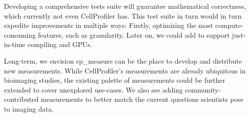 \documentclass{article}
\begin{document}
Developing a comprehensive tests suite will guarantee mathematical correctness, which currently not even CellProfiler has. This test suite in turn would in turn expedite improvements in multiple ways: Firstly, optimizing the most compute-consuming features, such as granularity. Later on, we could add to support just-in-time compiling and GPUs.

Long-term, we envision cp\_measure can be the place to develop and distribute new measurements. While CellProfiler's measurements are already ubiquitous in bioimaging studies, the existing palette of measurements could be further extended to cover unexplored use-cases. We also see adding community-contributed measurements to better match the current questions scientists pose to imaging data.



\end{document}
